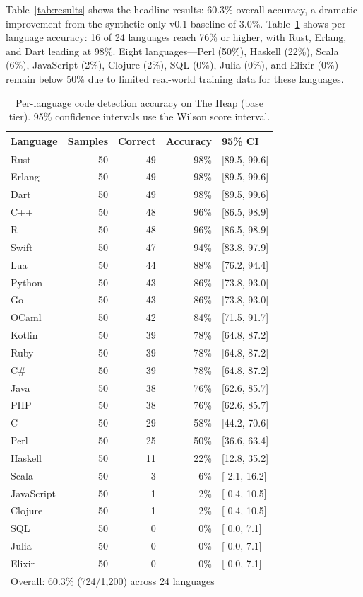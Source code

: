 \documentclass[11pt,a4paper]{article}
\begin{document}
Table~\ref{tab:results} shows the headline results: 60.3\% overall accuracy, a dramatic improvement from the synthetic-only v0.1 baseline of 3.0\%.
Table~\ref{tab:code_per_lang} shows per-language accuracy: 16 of 24 languages reach 76\% or higher, with Rust, Erlang, and Dart leading at 98\%.
Eight languages---Perl (50\%), Haskell (22\%), Scala (6\%), JavaScript (2\%), Clojure (2\%), SQL (0\%), Julia (0\%), and Elixir (0\%)---remain below 50\% due to limited real-world training data for these languages.

\begin{table}[h]
\centering
\begin{tabular}{lrrrl}
\toprule
Language & Samples & Correct & Accuracy & 95\% CI \\
\midrule
Rust      & 50 & 49 & 98\% & {[}89.5, 99.6{]} \\
Erlang    & 50 & 49 & 98\% & {[}89.5, 99.6{]} \\
Dart      & 50 & 49 & 98\% & {[}89.5, 99.6{]} \\
C++       & 50 & 48 & 96\% & {[}86.5, 98.9{]} \\
R         & 50 & 48 & 96\% & {[}86.5, 98.9{]} \\
Swift     & 50 & 47 & 94\% & {[}83.8, 97.9{]} \\
Lua       & 50 & 44 & 88\% & {[}76.2, 94.4{]} \\
Python    & 50 & 43 & 86\% & {[}73.8, 93.0{]} \\
Go        & 50 & 43 & 86\% & {[}73.8, 93.0{]} \\
OCaml     & 50 & 42 & 84\% & {[}71.5, 91.7{]} \\
Kotlin    & 50 & 39 & 78\% & {[}64.8, 87.2{]} \\
Ruby      & 50 & 39 & 78\% & {[}64.8, 87.2{]} \\
C\#       & 50 & 39 & 78\% & {[}64.8, 87.2{]} \\
Java      & 50 & 38 & 76\% & {[}62.6, 85.7{]} \\
PHP       & 50 & 38 & 76\% & {[}62.6, 85.7{]} \\
C         & 50 & 29 & 58\% & {[}44.2, 70.6{]} \\
Perl      & 50 & 25 & 50\% & {[}36.6, 63.4{]} \\
Haskell   & 50 & 11 & 22\% & {[}12.8, 35.2{]} \\
Scala     & 50 &  3 &  6\% & {[} 2.1, 16.2{]} \\
JavaScript& 50 &  1 &  2\% & {[} 0.4, 10.5{]} \\
Clojure   & 50 &  1 &  2\% & {[} 0.4, 10.5{]} \\
SQL       & 50 &  0 &  0\% & {[} 0.0,  7.1{]} \\
Julia     & 50 &  0 &  0\% & {[} 0.0,  7.1{]} \\
Elixir    & 50 &  0 &  0\% & {[} 0.0,  7.1{]} \\
\midrule
\multicolumn{5}{l}{Overall: 60.3\% (724/1,200) across 24 languages} \\
\bottomrule
\end{tabular}
\caption{\label{tab:code_per_lang} Per-language code detection accuracy on The Heap (base tier). 95\% confidence intervals use the Wilson score interval.}
\end{table}
\end{document}
